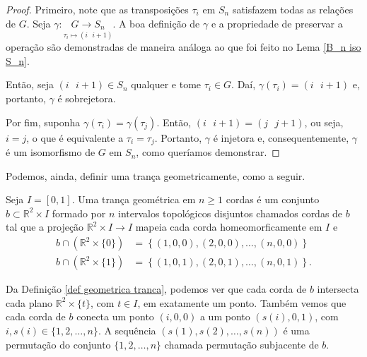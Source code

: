 	\begin{proof}
		Primeiro, note que as transposições $\tau_i$ em $S_n$ satisfazem todas as relações de $G$. 
		Seja $\gamma:\underset{\tau_i\mapsto (i\text{ }i+1)}{G\to S_n}$. A boa definição de $\gamma$ e 
		a propriedade de preservar a operação são demonstradas de maneira análoga ao que foi feito no 
		Lema \eqref{B_n iso S_n}.
		
		\par\vspace{0.3cm} Então, seja $(i\text{ }i+1)\in S_n$ qualquer e tome $\tau_i\in G$. Daí, 
		$\gamma(\tau_i) = (i\text{ }i+1)$ e, portanto, $\gamma$ é sobrejetora.
		
		\par\vspace{0.3cm} Por fim, suponha $\gamma(\tau_i) = \gamma(\tau_j)$. Então, $(i\text{ }i+1) 
		= (j\text{ }j+1)$, ou seja, $i = j$, o que é equivalente a $\tau_i = \tau_j$. Portanto, $\gamma$ é 
		injetora e, consequentemente, $\gamma$ é um isomorfismo de $G$ em $S_n$, como queríamos demonstrar.
	\end{proof}
	\par\vspace{0.3cm} Podemos, ainda, definir uma trança geometricamente, como a seguir.
	\begin{deff}
	\label{def geometrica tranca}
		Seja $I = [0,1]$. Uma trança geométrica em $n\geq 1$ cordas é um conjunto 
		$b\subset\mathbb{R}^2\times I$ formado por $n$ intervalos topológicos disjuntos chamados cordas 
		de $b$ tal que a projeção $\mathbb{R}^2\times I\to I$ mapeia cada corda homeomorficamente em $I$ e 
		\begin{align*}
    		b\cap (\mathbb{R}^2\times \{ 0 \}) &= \left\{ (1,0,0), (2,0,0), \dots, (n,0,0) \right\} \\
    		b\cap (\mathbb{R}^2\times \{ 1 \}) &= \left\{ (1,0,1), (2,0,1), \dots, (n,0,1) \right\}.
		\end{align*}
	\end{deff}
	\par\vspace{0.3cm} Da Definição \eqref{def geometrica tranca}, podemos ver que cada corda de $b$ 
	intersecta cada plano $\mathbb{R}^2\times\{t\}$, com $t\in I$, em exatamente um ponto. Também vemos 
	que cada corda de $b$ conecta um ponto $(i,0,0)$ a um ponto $(s(i), 0, 1)$, com $i,s(i)\in \{1, 2, \dots, n\}$.
	A sequência $(s(1), s(2), \dots, s(n))$ é uma permutação do conjunto $\{1, 2, \dots, n\}$ chamada permutação
	subjacente de $b$.

